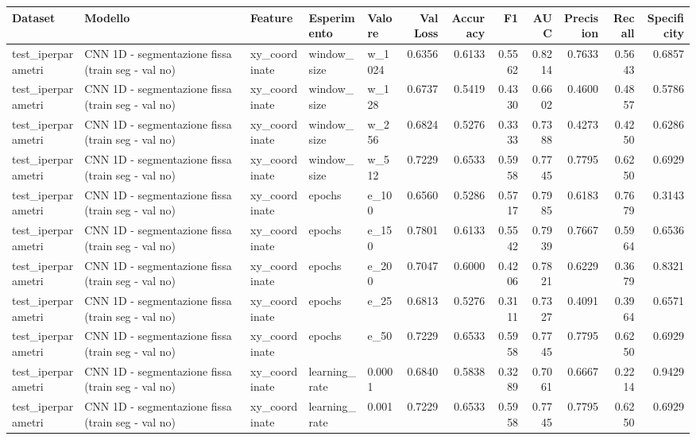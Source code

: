 \documentclass{article}
\begin{document}
\begin{table}[htbp]
\centering
\small
\begin{adjustbox}{max width=\textwidth}
\begin{tabular}{lllllrrrrrrr}
\toprule
Dataset & Modello & Feature & Esperimento & Valore & Val Loss & Accuracy & F1 & AUC & Precision & Recall & Specificity \\
\midrule
test\_iperparametri & CNN 1D - segmentazione fissa (train seg - val no) & xy\_coordinate & window\_size & w\_1024 & 0.6356 & 0.6133 & 0.5562 & 0.8214 & 0.7633 & 0.5643 & 0.6857 \\
test\_iperparametri & CNN 1D - segmentazione fissa (train seg - val no) & xy\_coordinate & window\_size & w\_128 & 0.6737 & 0.5419 & 0.4330 & 0.6602 & 0.4600 & 0.4857 & 0.5786 \\
test\_iperparametri & CNN 1D - segmentazione fissa (train seg - val no) & xy\_coordinate & window\_size & w\_256 & 0.6824 & 0.5276 & 0.3333 & 0.7388 & 0.4273 & 0.4250 & 0.6286 \\
test\_iperparametri & CNN 1D - segmentazione fissa (train seg - val no) & xy\_coordinate & window\_size & w\_512 & 0.7229 & 0.6533 & 0.5958 & 0.7745 & 0.7795 & 0.6250 & 0.6929 \\
test\_iperparametri & CNN 1D - segmentazione fissa (train seg - val no) & xy\_coordinate & epochs & e\_100 & 0.6560 & 0.5286 & 0.5717 & 0.7985 & 0.6183 & 0.7679 & 0.3143 \\
test\_iperparametri & CNN 1D - segmentazione fissa (train seg - val no) & xy\_coordinate & epochs & e\_150 & 0.7801 & 0.6133 & 0.5542 & 0.7939 & 0.7667 & 0.5964 & 0.6536 \\
test\_iperparametri & CNN 1D - segmentazione fissa (train seg - val no) & xy\_coordinate & epochs & e\_200 & 0.7047 & 0.6000 & 0.4206 & 0.7821 & 0.6229 & 0.3679 & 0.8321 \\
test\_iperparametri & CNN 1D - segmentazione fissa (train seg - val no) & xy\_coordinate & epochs & e\_25 & 0.6813 & 0.5276 & 0.3111 & 0.7327 & 0.4091 & 0.3964 & 0.6571 \\
test\_iperparametri & CNN 1D - segmentazione fissa (train seg - val no) & xy\_coordinate & epochs & e\_50 & 0.7229 & 0.6533 & 0.5958 & 0.7745 & 0.7795 & 0.6250 & 0.6929 \\
test\_iperparametri & CNN 1D - segmentazione fissa (train seg - val no) & xy\_coordinate & learning\_rate & 0.0001 & 0.6840 & 0.5838 & 0.3289 & 0.7061 & 0.6667 & 0.2214 & 0.9429 \\
test\_iperparametri & CNN 1D - segmentazione fissa (train seg - val no) & xy\_coordinate & learning\_rate & 0.001 & 0.7229 & 0.6533 & 0.5958 & 0.7745 & 0.7795 & 0.6250 & 0.6929 \\

\end{tabular}
\end{adjustbox}
\end{table}
\end{document}
